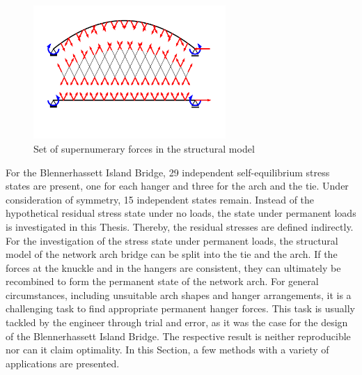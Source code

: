 \begin{figure}[H]
    \centering
    \includegraphics[trim={1cm 16cm 4cm 6.5cm},clip, width=0.65\textwidth]{overleaf/Pictures/Supernumerary forces.png}
    \caption{Set of supernumerary forces in the structural model}
    \label{fig:super_forces}
\end{figure}

For the Blennerhassett Island Bridge, 29 independent self-equilibrium stress states are present, one for each hanger and three for the arch and the tie. Under consideration of symmetry, 15 independent states remain. Instead of the hypothetical residual stress state under no loads, the state under permanent loads is investigated in this Thesis. Thereby, the residual stresses are defined indirectly. 
For the investigation of the stress state under permanent loads, the structural model of the network arch bridge can be split into the tie and the arch. If the forces at the knuckle and in the hangers are consistent, they can ultimately be recombined to form the permanent state of the network arch.
For general circumstances, including unsuitable arch shapes and hanger arrangements, it is a challenging task to find appropriate permanent hanger forces. This task is usually tackled by the engineer through trial and error, as it was the case for the design of the Blennerhassett Island Bridge. The respective result is neither reproducible nor can it claim optimality. In this Section, a few methods with a variety of applications are presented. 


